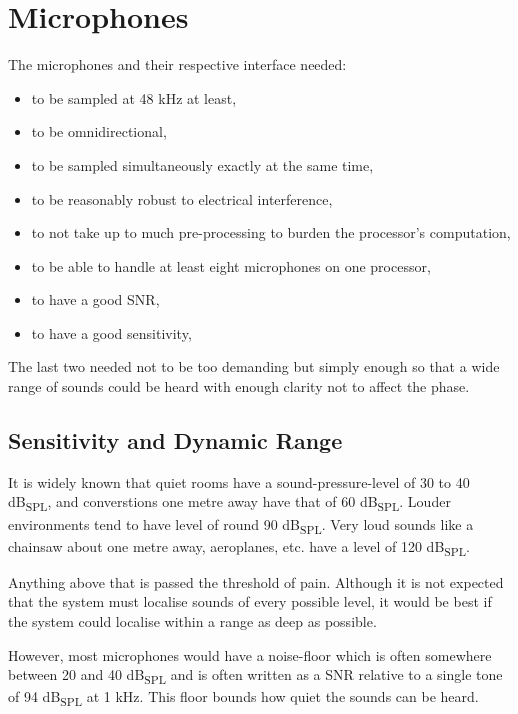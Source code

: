\documentclass[notitlepage]{report}
\begin{document}
\section{Microphones}

The microphones and their respective interface needed:
\begin{itemize}
	\item to be sampled at 48 \si{kHz} at least,
	\item to be omnidirectional,
	\item to be sampled simultaneously exactly at the same time,
	\item to be reasonably robust to electrical interference,
	\item to not take up to much pre-processing to burden the processor's computation,
	\item to be able to handle at least eight microphones on one processor,
	\item to have a good SNR,
	\item to have a good sensitivity,
\end{itemize}
The last two needed not to be too demanding but simply enough so that a wide range of sounds could be heard with enough clarity not to affect the phase.

\subsection{Sensitivity and Dynamic Range}

It is widely known that quiet rooms have a sound-pressure-level of 30 to 40 \si{dB_{SPL}}, and converstions one metre away have that of 60 \si{dB_{SPL}}. Louder environments tend to have level of round 90 \si{dB_{SPL}}. Very loud sounds like a chainsaw about one metre away, aeroplanes, etc. have a level of 120 \si{dB_{SPL}}. 


Anything above that is passed the threshold of pain. Although it is not expected that the system must localise sounds of every possible level, it would be best if the system could localise within a range as deep as possible.

However, most microphones would have a noise-floor which is often somewhere between 20 and 40 \si{dB_{SPL}} and is often written as a SNR relative to a single tone of 94 \si{dB_{SPL}} at 1 \si{kHz}. This floor bounds how quiet the sounds can be heard.

\end{document}
